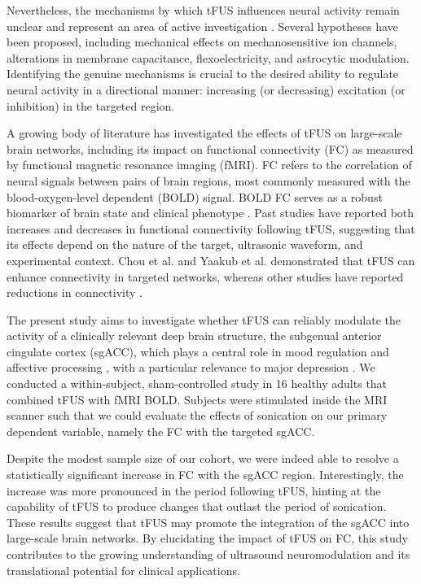 \documentclass[conference]{ieeeconf}
\begin{document}
Nevertheless, the mechanisms by which tFUS influences neural activity remain unclear and represent an area of active investigation \cite{Blackmore2019-zo,kamimura2020ultrasound,dell2022current}. Several hypotheses have been proposed, including mechanical effects on mechanosensitive ion channels, alterations in membrane capacitance, flexoelectricity, and astrocytic modulation. Identifying the genuine mechanisms is crucial to the desired ability to regulate neural activity in a directional manner: increasing (or decreasing) excitation (or inhibition) in the targeted region. 

A growing body of literature has investigated the effects of tFUS on large-scale brain networks, including its impact on functional connectivity (FC) as measured by functional magnetic resonance imaging (fMRI). FC refers to the correlation of neural signals between pairs of brain regions, most commonly measured with the blood-oxygen-level dependent (BOLD) signal. BOLD FC serves as a robust biomarker of brain state and clinical phenotype \cite{rogers2007assessing, van2010exploring}. Past studies have reported both increases and decreases in functional connectivity following tFUS, suggesting that its effects depend on the nature of the target, ultrasonic waveform, and experimental context. Chou et al. \cite{chou2024transcranial} and Yaakub et al. \cite{yaakub2023transcranial} demonstrated that tFUS can enhance connectivity in targeted networks, whereas other studies have reported reductions in connectivity \cite{todd2018focused,meng2019resting,sanguinetti2020transcranial,zhang2021low,kuhn2023transcranial,lord2024transcranial}. 

The present study aims to investigate whether tFUS can reliably modulate the activity of a clinically relevant deep brain structure, the subgenual anterior cingulate cortex (sgACC), which plays a central role in mood regulation and affective processing \cite{drevets2008subgenual}, with a particular relevance to major depression \cite{greicius2007resting}. We conducted a within-subject, sham-controlled study in 16 healthy adults that combined tFUS with fMRI BOLD. Subjects were stimulated inside the MRI scanner such that we could evaluate the effects of sonication on our primary dependent variable, namely the FC with the targeted sgACC. 

Despite the modest sample size of our cohort, we were indeed able to resolve a statistically significant increase in FC with the sgACC region. Interestingly, the increase was more pronounced in the period following tFUS, hinting at the capability of tFUS to produce changes that outlast the period of sonication. These results suggest that tFUS may promote the integration of the sgACC into large-scale brain networks.
By elucidating the impact of tFUS on FC, this study contributes to the growing understanding of ultrasound neuromodulation and its translational potential for clinical applications. 
\end{document}
